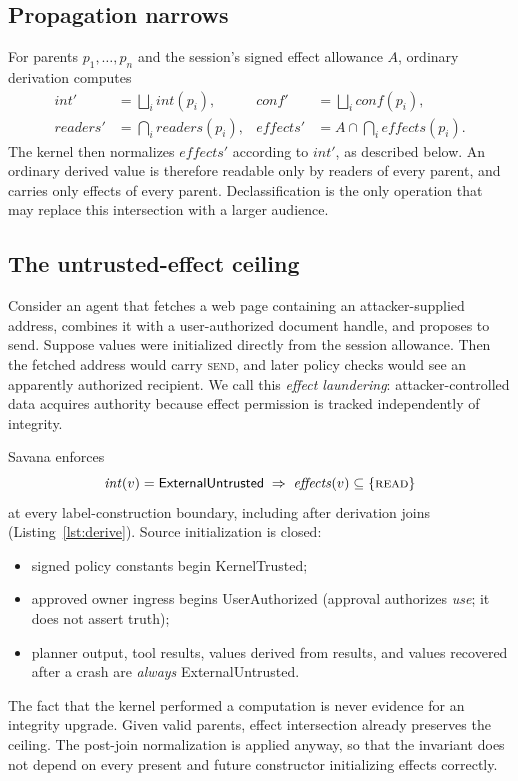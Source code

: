 \documentclass[letterpaper,twocolumn,10pt]{article}
\newcommand{\sys}{Savana}
\newcommand{\READ}{\textsc{read}}
\newcommand{\SEND}{\textsc{send}}
\newcommand{\integ}{\mathit{int}}
\newcommand{\conf}{\mathit{conf}}
\newcommand{\readers}{\mathit{readers}}
\newcommand{\effects}{\mathit{effects}}
\begin{document}
\subsection{Propagation narrows}

For parents $p_1,\ldots,p_n$ and the session's signed effect allowance $A$,
ordinary derivation computes
\begin{align*}
\integ' &= \textstyle\bigsqcup_i\integ(p_i), &
\conf' &= \textstyle\bigsqcup_i\conf(p_i),\\
\readers' &= \textstyle\bigcap_i\readers(p_i), &
\effects' &= A\cap\textstyle\bigcap_i\effects(p_i).
\end{align*}
The kernel then normalizes $\effects'$ according to $\integ'$, as described
below. An ordinary derived value is therefore readable only by readers of
every parent, and carries only effects of every parent. Declassification
is the only operation that may replace this intersection with a larger
audience.

\subsection{The untrusted-effect ceiling}
\label{sec:ceiling}

Consider an agent that fetches a web page containing an attacker-supplied
address, combines it with a user-authorized document handle, and proposes
to send. Suppose values were initialized directly from the session
allowance. Then the fetched address would carry \SEND{}, and later policy
checks would see an apparently authorized recipient. We call this
\emph{effect laundering}: attacker-controlled data acquires authority
because effect permission is tracked independently of integrity.

\sys{} enforces
\[
\integ(v)=\textsf{ExternalUntrusted}\;\Rightarrow\;\effects(v)\subseteq\{\READ\}
\]
at every label-construction boundary, including after derivation joins
(Listing~\ref{lst:derive}). Source initialization is closed:
\begin{itemize}
\item signed policy constants begin \textsf{KernelTrusted};
\item approved owner ingress begins \textsf{UserAuthorized} (approval
  authorizes \emph{use}; it does not assert truth);
\item planner output, tool results, values derived from results, and values
  recovered after a crash are \emph{always} \textsf{ExternalUntrusted}.
\end{itemize}
The fact that the kernel performed a computation is never evidence for an
integrity upgrade. Given valid parents, effect intersection already
preserves the ceiling. The post-join normalization is applied anyway, so
that the invariant does not depend on every present and future constructor
initializing effects correctly.
\end{document}
